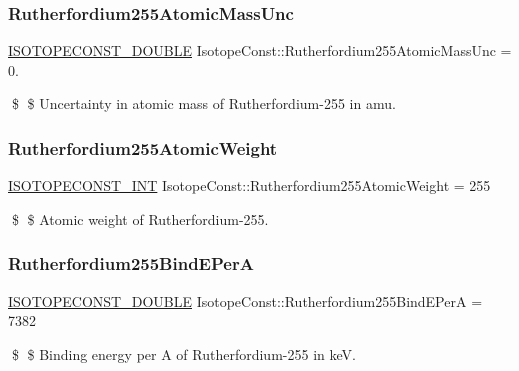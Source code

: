 \subsubsection{\texorpdfstring{Rutherfordium255\+Atomic\+Mass\+Unc}{Rutherfordium255AtomicMassUnc}}
{\footnotesize\ttfamily \mbox{\hyperlink{group___isotope_const-_macros_ga8f45a7272ce02c0b4c65c44636ed719a}{I\+S\+O\+T\+O\+P\+E\+C\+O\+N\+S\+T\+\_\+\+D\+O\+U\+B\+LE}} Isotope\+Const\+::\+Rutherfordium255\+Atomic\+Mass\+Unc = 0.}

\$ \$ Uncertainty in atomic mass of Rutherfordium-\/255 in amu. \mbox{\label{group___isotope_const-_rutherfordium-_rf255_gac2e5e9ca1f37b39a35f6423fad093a30}} 
\subsubsection{\texorpdfstring{Rutherfordium255\+Atomic\+Weight}{Rutherfordium255AtomicWeight}}
{\footnotesize\ttfamily \mbox{\hyperlink{group___isotope_const-_macros_ga5f18360b3e99483a35c32d789e62621c}{I\+S\+O\+T\+O\+P\+E\+C\+O\+N\+S\+T\+\_\+\+I\+NT}} Isotope\+Const\+::\+Rutherfordium255\+Atomic\+Weight = 255}

\$ \$ Atomic weight of Rutherfordium-\/255. \mbox{\label{group___isotope_const-_rutherfordium-_rf255_gaa29978ad34205e345f657d64394c90cb}} 
\subsubsection{\texorpdfstring{Rutherfordium255\+Bind\+E\+PerA}{Rutherfordium255BindEPerA}}
{\footnotesize\ttfamily \mbox{\hyperlink{group___isotope_const-_macros_ga8f45a7272ce02c0b4c65c44636ed719a}{I\+S\+O\+T\+O\+P\+E\+C\+O\+N\+S\+T\+\_\+\+D\+O\+U\+B\+LE}} Isotope\+Const\+::\+Rutherfordium255\+Bind\+E\+PerA = 7382}

\$ \$ Binding energy per A of Rutherfordium-\/255 in keV. \mbox{\label{group___isotope_const-_rutherfordium-_rf255_ga0dbb389acb0612f0ec6556b00e3f41ba}} 
